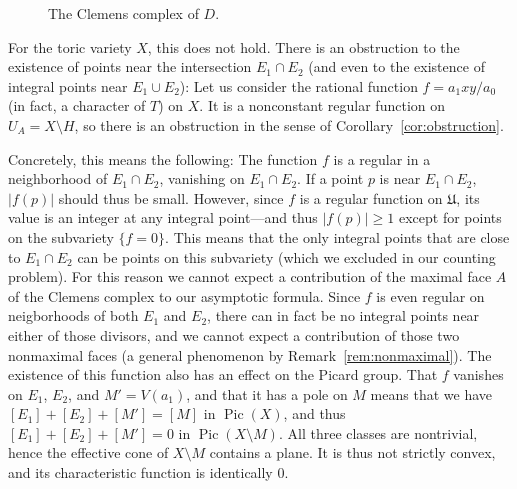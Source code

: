 \documentclass[a4paper, twoside, 10pt]{amsart}
\newcommand{\mU}{\mathfrak{U}}
\DeclareMathOperator{\Pic}{Pic}
\newcommand{\abs}[1]{\left\lvert#1\right\rvert}
\theoremstyle{definition}
\begin{document}
\begin{figure}[ht]
  \begin{center}
    \caption{The Clemens complex of $D$.}
  \end{center}
\end{figure}

For the toric variety $X$, this does not hold. There is an obstruction to the existence of points near the intersection $E_1\cap E_2$ (and even to the existence of integral points near $E_1\cup E_2$):
Let us consider the rational function $f=a_1xy/a_0$ (in fact, a character of $T$) on $X$. It is a nonconstant regular function on $U_A=X\setminus H$, so there is an obstruction in the sense of Corollary~\ref{cor:obstruction}.

Concretely, this means the following: The function $f$ is a regular in a neighborhood of $E_1\cap E_2$, vanishing on $E_1\cap E_2$. If a point $p$ is near $E_1\cap E_2$, $\abs{f(p)}$ should thus be small. However, since $f$ is a regular function on $\mU$, its value is an integer at any integral point---and thus $\abs{f(p)}\ge 1$ except for points on the subvariety $\{f=0\}$. This means that the only integral points that are close to $E_1\cap E_2$ can be points on this subvariety (which we excluded in our counting problem).
For this reason we cannot expect a contribution of the maximal face $A$ of the Clemens complex to our asymptotic formula.
Since $f$ is even regular on neigborhoods of both $E_1$ and $E_2$, there can in fact be no integral points near either of those divisors, and we cannot expect a contribution of those two nonmaximal faces (a general phenomenon by Remark~\ref{rem:nonmaximal}).
The existence of this function also has an effect on the Picard group. That $f$ vanishes on $E_1$, $E_2$, and $M'=V(a_1)$, and that it has a pole on $M$ means that we have $[E_1]+[E_2]+[M']=[M]$ in $\Pic(X)$, and thus $[E_1]+[E_2]+[M']=0$ in $\Pic(X\setminus M)$. All three classes are nontrivial, hence the effective cone of $X\setminus M$ contains a plane. It is thus not strictly convex, and its characteristic function is identically $0$.
\end{document}

